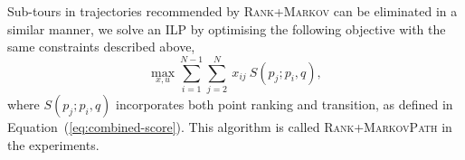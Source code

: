 Sub-tours in trajectories recommended by \textsc{Rank+Markov} can be eliminated in a similar manner,
we solve an ILP by optimising the following objective 
with the same constraints described above,
\vspace{-1em}
\begin{equation}
\label{eq:obj2}
\max_{x,u} \sum_{i=1}^{N-1} \sum_{j=2}^N ~x_{ij} ~S(p_j; p_i, q),
\end{equation}
where $S(p_j;p_i,q)$ incorporates both point ranking and transition, as defined in Equation~(\ref{eq:combined-score}).
This algorithm is called \textsc{Rank+MarkovPath} in the experiments.
